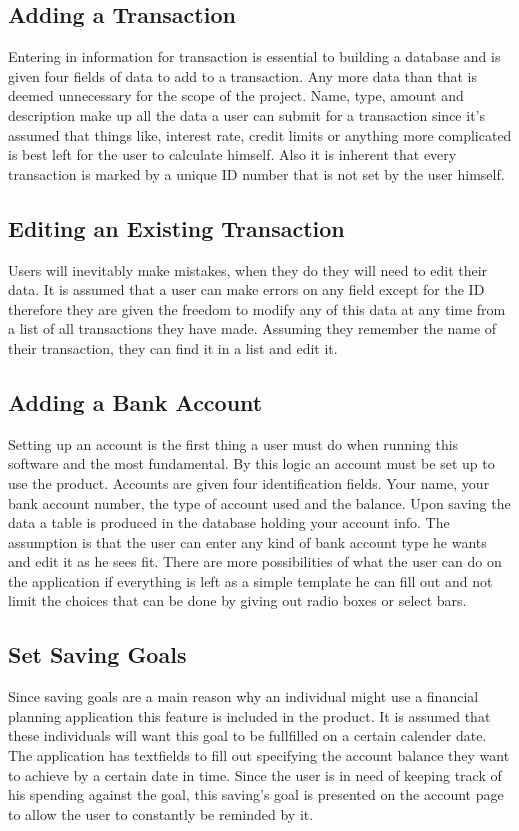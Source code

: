 \documentclass[12pt]{article}
\begin{document}
\subsection{Adding a Transaction}
	Entering in information for transaction is essential to building a database and is given four fields of data to add to a transaction. Any more data than that is deemed unnecessary for the scope of the project. Name, type, amount and description make up all the data a user can submit for a transaction since it's assumed that things like, interest rate, credit limits or anything more complicated is best left for the user to calculate himself. Also it is inherent that every transaction is marked by a unique ID number that is not set by the user himself.
\subsection{Editing an Existing Transaction}
	Users will inevitably make mistakes, when they do they will need to edit their data. It is assumed that a user can make errors on any field except for the ID therefore they are given the freedom to modify any of this data at any time from a list of all transactions they have made. Assuming they remember the name of their transaction, they can find it in a list and edit it. 
\subsection{Adding a Bank Account}
	Setting up an account is the first thing a user must do when running this software and the most fundamental. By this logic an account must be set up to use the product. Accounts are given four identification fields. Your name, your bank account number, the type of account used and the balance. Upon saving the data a table is produced in the database holding your account info. The assumption is that the user can enter any kind of bank account type he wants and edit it as he sees fit. There are more possibilities of what the user can do on the application if everything is left as a simple template he can fill out and not limit the choices that can be done by giving out radio boxes or select bars.
\subsection{Set Saving Goals}
	Since saving goals are a main reason why an individual might use a financial planning application this feature is included in the product. It is assumed that these individuals will want this goal to be fullfilled on a certain calender date. The application has textfields to fill out specifying the account balance they want to achieve by a certain date in time. Since the user is in need of keeping track of his spending against the goal, this saving's goal is presented on the account page to allow the user to constantly be reminded by it.
	
\end{document}
